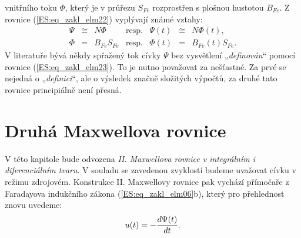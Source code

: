      vnitřního toku \(\Phi\), který je v průřezu \(S_{Fe}\) rozprostřen s plošnou hustotou 
      \(B_{Fe}\). Z rovnice (\ref{ES:eq_zakl_elm22}) vyplývají známé vztahy:
      \begin{equation}\label{ES:eq_zakl_elm23}
        \begin{array}{rclclcl} 
          \Psi & \cong & N\Phi   &  \text{resp.}  & \Psi(t)& \cong & N\Phi(t),          \\ 
          \Phi & = & B_{Fe}S_{Fe}&  \text{resp.}  & \Phi(t)& =     & B_{Fe}(t)S_{Fe}.
        \end{array}
      \end{equation}
      V literatuře bývá někdy spřažený tok cívky \(\Psi\) bez vysvětlení „\emph{definován}“ pomocí 
      rovnice (\ref{ES:eq_zakl_elm23}). To je nutno považovat za nešťastné. Za prvé se nejedná o 
      „\emph{definici}“, ale o výsledek značně složitých výpočtů, za druhé tato rovnice 
      principiálně není přesná.

    \section{Druhá Maxwellova rovnice}\label{ES:sec04}
    
      V této kapitole bude odvozena \emph{II. Maxwellova rovnice v integrálním i diferenciálním 
      tvaru}. V souladu se zavedenou zvyklostí budeme uvažovat cívku v režimu zdrojovém. Konstrukce 
      II. Maxwellovy rovnice pak vychází přímočaře z Faradayova indukčního zákona 
      (\ref{ES:eq_zakl_elm06}b), který pro přehlednost znovu uvedeme:
      \begin{equation}\label{ES:eq_zakl_elm24}
      u(t) = -\dfrac{d \Psi(t)}{d t}.
      \end{equation}
      
